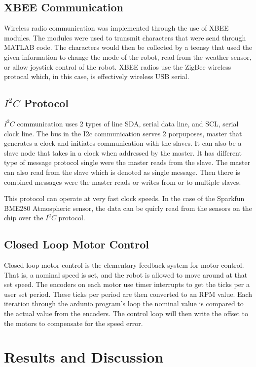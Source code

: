 \documentclass[UTF8]{article}
\begin{document}
\subsection{XBEE Communication}
Wireless radio communication was implemented through the use of XBEE modules. The modules were used to transmit characters that were send through MATLAB code. The characters would then be collected by a teensy that used the given information to change the mode of the robot, read from the weather sensor, or allow joystick control of the robot. XBEE radios use the ZigBee wireless protocal which, in this case, is effectively wireless USB serial.

\subsection{$I^2C$ Protocol}
$I^2C$ communication uses 2 types of line SDA, serial data line, and SCL, serial clock line. The bus in the I2c communication serves 2 porpuposes, master that generates a clock and initiates communication with the slaves. It can also be a slave node that takes in a clock when addressed by the master. It has different type of message protocol single were the master reads from the slave. The master can also read from the slave which is denoted as single message. Then there is combined messages were the master reads or writes from or to multiple slaves.

\vspace{4mm}
\noindent
This protocol can operate at very fast clock speeds. In the case of the Sparkfun BME280 Atmospheric sensor, the data can be quicly read from the sensors on the chip over the $I^2C$ protocol. 

\subsection{Closed Loop Motor Control}
Closed loop motor control is the elementary feedback system for motor control. That is, a nominal speed is set, and the robot is allowed to move around at that set speed. The encoders on each motor use timer interrupts to get the ticks per a user set period. These ticks per period are then converted to an RPM value. Each iteration through the ardunio program's loop the nominal value is compared to the actual value from the encoders. The control loop will then write the offset to the motors to compensate for the speed error. 


\section{Results and Discussion}
\end{document}
